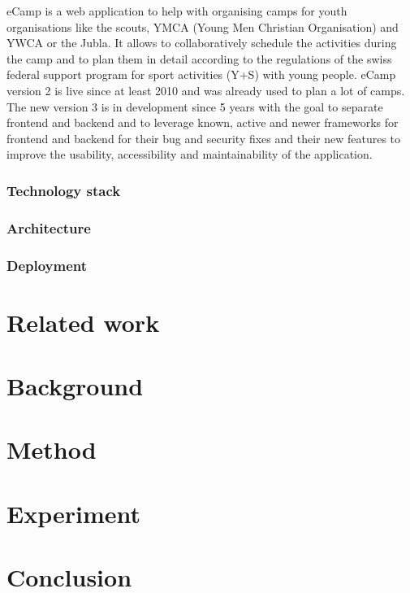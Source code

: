 \documentclass[conference]{IEEEtran}
\begin{document}
eCamp is a web application to help with organising camps for youth organisations like the
scouts, YMCA (Young Men Christian Organisation)\cite{ymca-website} and YWCA or the Jubla.
It allows to collaboratively schedule the activities during the camp and to plan them in detail
according to the regulations of the swiss federal support program for sport activities (Y+S) with young people\cite{J+S-Website,ecamp3-website}.
eCamp version 2 is live since at least 2010\cite{ecamp2-first-commit} and was already used to plan a lot of camps.
The new version 3 is in development since 5 years\cite{ecamp3-website} with the goal to separate frontend and backend and
to leverage known, active and newer frameworks for frontend and backend for their bug and security fixes and
their new features to improve the usability, accessibility and maintainability of the application.

\subsubsection{Technology stack}

\subsubsection{Architecture}

\subsubsection{Deployment}

\section{Related work}

\section{Background}

\section{Method}

\section{Experiment}

\section{Conclusion}




\date{\today}



\newpage
%
\end{document}
